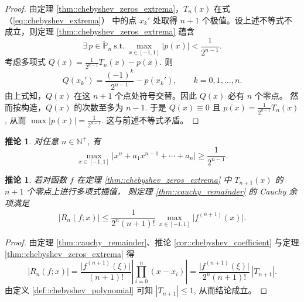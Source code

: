 \documentclass[a4paper]{ctexart}
\newtheorem{corollary}[theorem]{推论}
\numberwithin{theorem}{section}
\numberwithin{equation}{section}
\numberwithin{figure}{section}
\numberwithin{remark}{section}
\begin{document}
\begin{proof}
由定理 \ref{thm::chebyshev_zeros_extrema}，$T_n(x)$ 在式（\ref{eq::chebyshev_extrema}）
中的点 $x_k'$ 处取得 $n+1$ 个极值。设上述不等式不成立，则定理 \ref{thm::chebyshev_zeros_extrema} 蕴含
\begin{equation}
    \label{eq::chebyshev_contradiction}
\exists\,p\in\widetilde{\mathbb{P}}_n\ \text{s.t.}\ 
\max_{x\in[-1,1]}|p(x)|<\frac{1}{2^{n-1}}.
\end{equation}
考虑多项式 $Q(x)=\frac{1}{2^{n-1}}T_n(x)-p(x)$. 则
\begin{equation*}
Q(x_k')=\frac{(-1)^k}{2^{n-1}}-p(x_k'),\qquad k=0,1,\ldots,n.
\end{equation*}
由上式知，$Q(x)$ 在这 $n+1$ 个点处符号交替。因此 $Q(x)$ 必有 $n$ 个零点。
然而按构造，$Q(x)$ 的次数至多为 $n-1$. 于是 $Q(x)\equiv 0$ 且 $p(x)=\frac{1}{2^{n-1}}T_n(x)$, 从而
$\max |p(x)|=\frac{1}{2^{n-1}}$. 这与前述不等式矛盾。
\end{proof}

\begin{corollary}
对任意 $n\in\mathbb{N}^+$, 有
\begin{equation}
    \label{eq::chebyshev_lower_bound}
\max_{x\in[-1,1]}\bigl|x^n+a_1 x^{n-1}+\cdots+a_n\bigr|\ge \frac{1}{2^{n-1}}.
\end{equation}
\end{corollary}

\begin{corollary}
若对函数 $f$ 在定理 \ref{thm::chebyshev_zeros_extrema} 中 $T_{n+1}(x)$ 的 $n+1$ 个零点上进行多项式插值，
则定理 \ref{thm::cauchy_remainder} 的 Cauchy 余项满足
\begin{equation}
    \label{eq::chebyshev_remainder}
\lvert R_n(f;x)\rvert \le \frac{1}{2^n (n+1)!}\,
\max_{x\in[-1,1]}\bigl|f^{(n+1)}(x)\bigr|.
\end{equation}
\end{corollary}

\begin{proof}
由定理 \ref{thm::cauchy_remainder}、推论 \ref{cor::chebyshev_coefficient} 与定理 \ref{thm::chebyshev_zeros_extrema} 得
\begin{equation*}
\lvert R_n(f;x)\rvert
=\frac{\lvert f^{(n+1)}(\xi)\rvert}{(n+1)!}\left|\prod_{i=0}^{n}(x-x_i)\right|
=\frac{\lvert f^{(n+1)}(\xi)\rvert}{2^n (n+1)!}\,|T_{n+1}|.
\end{equation*}
由定义 \ref{def::chebyshev_polynomial} 可知 $|T_{n+1}|\le 1$, 从而结论成立。
\end{proof}
\end{document}
